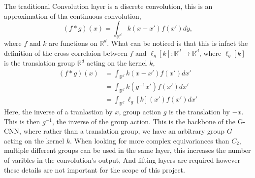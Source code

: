 The traditional Convolution layer is a discrete convolution, this is an approximation of tha continuous convolution, 
\begin{equation}
    (f*g)(x) = \int_{\mathbb{R}^d} k(x-x')f(x')dy,
\end{equation}
where $f$ and $k$ are functions on $\mathbb{R}^d$. What can be noticed is that this is infact the definition of the cross correlaion between $f$ and $\ell_g[k]:  \mathbb{R}^d  \rightarrow \mathbb{R}^d$, where $\ell_g[k]$
is the translation group $\mathbb{R}^d$ acting on the kernel $k$,
\begin{align}
    (f*g)(x) &= \int_{\mathbb{R}^d} k(x-x')f(x')dx' \\
    &= \int_{\mathbb{R}^d} k(g^{-1}x')f(x')dx' \\
    &= \int_{\mathbb{R}^d} \ell_g[k](x')f(x')dx'
\end{align}
Here, the inverse of a tranlastion by $x$, group action $g$ is the translation by $-x$. This is then $g^{-1}$, the inverse of the group action. This is the backbone of the G-CNN\cite{cohen2016group}, where rather than a translation group, we have an arbitrary group $G$ acting on the kernel $k$. When looking for more complex equivariances than $C_2$, multiple different groups can be used in the same layer, this increases the number of varibles in the convolution's output,
And lifting layers are required however these details are not important for the scope of this project.